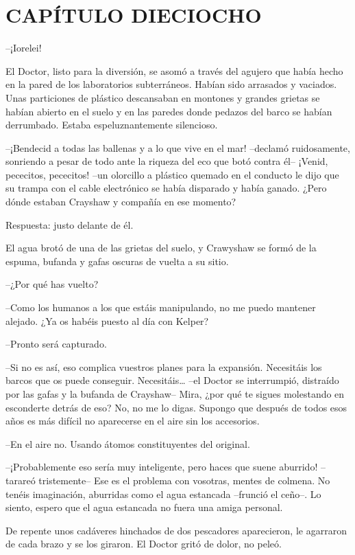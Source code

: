 \chapter*{CAPÍTULO DIECIOCHO}

{--¡Iorelei!}

{El Doctor, listo para la diversión, se asomó a través del agujero que
 había hecho en la pared de los laboratorios subterráneos. Habían sido
 arrasados y vaciados. Unas particiones de plástico descansaban en
 montones y grandes grietas se habían abierto en el suelo y en las
 paredes donde pedazos del barco se habían derrumbado. Estaba
espeluznantemente silencioso.}

{--¡Bendecid a todas las ballenas y a lo que vive en el mar! --declamó
 ruidosamente, sonriendo a pesar de todo ante la riqueza del eco que botó
 contra él-- ¡Venid, pececitos, pececitos! --un olorcillo a plástico
 quemado en el conducto le dijo que su trampa con el cable electrónico se
 había disparado y había ganado. ¿Pero dónde estaban Crayshaw y compañía
en ese momento?}

{Respuesta: justo delante de él.}

{El agua brotó de una de las grietas del suelo, y Crawyshaw se formó de
la espuma, bufanda y gafas oscuras de vuelta a su sitio.}

{--¿Por qué has vuelto?}

{--Como los humanos a los que estáis manipulando, no me puedo mantener
alejado. ¿Ya os habéis puesto al día con Kelper?}

{--Pronto será capturado.}

{--Si no es así, eso complica vuestros planes para la expansión.
 Necesitáis los barcos que os puede conseguir. Necesitáis\ldots{} --el
 Doctor se interrumpió, distraído por las gafas y la bufanda de
 Crayshaw-- Mira, ¿por qué te sigues molestando en esconderte detrás de
 eso? No, no me lo digas. Supongo que después de todos esos años es más
difícil no aparecerse en el aire sin los accesorios.}

{--En el aire no. Usando átomos constituyentes del original.}

{--¡Probablemente eso sería muy inteligente, pero haces que suene
 aburrido! --tarareó tristemente-- Ese es el problema con vosotras,
 mentes de colmena. No tenéis imaginación, aburridas como el agua
 estancada --frunció el ceño--. Lo siento, espero que el agua estancada
no fuera una amiga personal.}

{De repente unos cadáveres hinchados de dos pescadores aparecieron, le
 agarraron de cada brazo y se los giraron. El Doctor gritó de dolor, no
peleó.}

